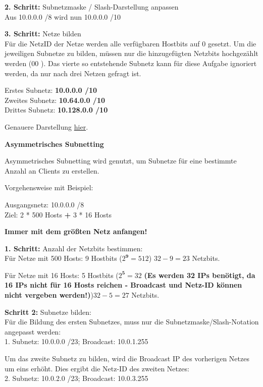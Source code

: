 \documentclass[asp1.tex]{subfiles}
\begin{document}
\textbf{2. Schritt:} Subnetzmaske / Slash-Darstellung anpassen\\
Aus 10.0.0.0 /8 wird nun 10.0.0.0 /10

\textbf{3. Schritt:} Netze bilden\\
Für die NetzID der Netze werden alle verfügbaren Hostbits auf 0 gesetzt. Um die jeweiligen Subnetze zu bilden, müssen nur die hinzugefügten Netzbits hochgezählt werden (00 \textrightarrow{} \textrightarrow{}). Das vierte so entstehende Subnetz kann für diese Aufgabe ignoriert werden, da nur nach drei Netzen gefragt ist.

Erstes Subnetz: \textbf{10.0.0.0 /10}\\
Zweites Subnetz: \textbf{10.64.0.0 /10}\\
Drittes Subnetz: \textbf{10.128.0.0 /10}

Genauere Darstellung \href{https://jodies.de/ipcalc?host=10.0.0.0&mask1=8&mask2=10}{hier}.

\break

\textbf{Asymmetrisches Subnetting}

Asymmetrisches Subnetting wird genutzt, um Subnetze für eine bestimmte Anzahl an Clients zu erstellen.

Vorgehensweise mit Beispiel:

Ausgangsnetz: 10.0.0.0 /8\\
Ziel: 2 * 500 Hosts \textbf{+} 3 * 16 Hosts

\textbf{Immer mit dem größten Netz anfangen!}

\textbf{1. Schritt:} Anzahl der Netzbits bestimmen:\\
Für Netze mit 500 Hosts: 9 Hostbits (\(2^\textbf{9} = 512\)) \textrightarrow\space \(32-9 = 23\) Netzbits.

Für Netze mit 16 Hosts: 5 Hostbits (\(2^\textbf{5} = 32\) \textbf{(Es werden 32 IPs benötigt, da 16 IPs nicht für 16 Hosts reichen - Broadcast und Netz-ID können nicht vergeben werden!)})\textrightarrow\space \(32-5 = 27\) Netzbits.

\textbf{Schritt 2:} Subnetze bilden:\\
Für die Bildung des ersten Subnetzes, muss nur die Subnetzmaske/Slash-Notation angepasst werden:\\
1. Subnetz: 10.0.0.0 /23; Broadcast: 10.0.1.255

Um das zweite Subnetz zu bilden, wird die Broadcast IP des vorherigen Netzes um eins erhöht. Dies ergibt die Netz-ID des zweiten Netzes:\\
2. Subnetz: 10.0.2.0 /23; Broadcast: 10.0.3.255
\end{document}
